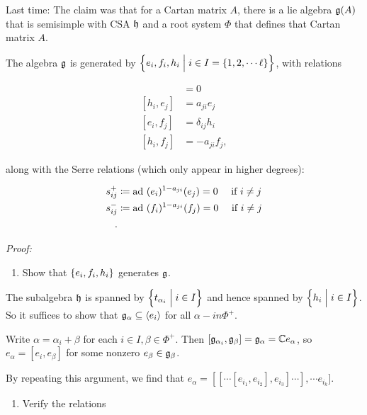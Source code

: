 Last time: The claim was that for a Cartan matrix \(A\), there is a lie
algebra \({\mathfrak{g}}(A)\) that is semisimple with CSA \({\mathfrak{h}}\) and a root
system \(\Phi\) that defines that Cartan matrix \(A\).

The algebra \({\mathfrak{g}}\) is generated by
\(\left\{{e_i, f_i, h_i \mathrel{\Big|} i\in I = \left\{{1, 2, \cdots \ell}\right\}}\right\}\),
with relations

\begin{align*}
[h_i, h_j] &= 0 \\
[h_i, e_j] &= a_{ji} e_j \\
[e_i, f_j] &= \delta_{ij} h_i \\
[h_i, f_j] &= -a_{ji} f_j,
\end{align*}

along with the Serre relations (which only appear in higher degrees):

\begin{align*}
s^+_{ij} &\coloneqq \mathrm{ad}~(e_i)^{1 - a_{ji}} (e_j) = 0 \quad \text{ if } i\neq j\\
s^-_{ij} &\coloneqq \mathrm{ad}~(f_i)^{1 - a_{ji}} (f_j) = 0 \quad \text{ if } i\neq j \\
.\end{align*}

\emph{Proof:}

\begin{enumerate}
\def\labelenumi{\arabic{enumi}.}
\tightlist
\item
  Show that \(\left\{{e_i, f_i, h_i}\right\}\) generates \({\mathfrak{g}}\).
\end{enumerate}

The subalgebra \({\mathfrak{h}}\) is spanned by
\(\left\{{ t_{\alpha_i} \mathrel{\Big|} i\in I }\right\}\) and hence spanned by
\(\left\{{h_i \mathrel{\Big|} i\in I}\right\}\). So it suffices to show that
\({\mathfrak{g}}_{\alpha} \subseteq \left\langle{e_i}\right\rangle\) for all
\(\alpha -in \Phi^+\).

Write \(\alpha = \alpha_i + \beta\) for each
\(i\in I, \beta \in \Phi^+\). Then
\([{\mathfrak{g}}_{\alpha_i}, {\mathfrak{g}}_\beta] = {\mathfrak{g}}_\alpha = {\mathbb{C}} e_\alpha\), so
\(e_\alpha = [e_i, e_\beta]\) for some nonzero
\(e_\beta \in {\mathfrak{g}}_\beta\).

By repeating this argument, we find that
\(e_\alpha = [ [ \cdots [e_{i_1}, e_{i_2}], e_{i_3}] \cdots ], \cdots e_{i_k} ]\).

\begin{enumerate}
\def\labelenumi{\arabic{enumi}.}
\setcounter{enumi}{1}
\tightlist
\item
  Verify the relations
\end{enumerate}

